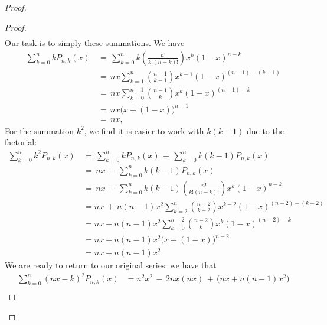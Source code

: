 \documentclass[11pt]{article}
\begin{document}
\begin{adjustwidth}{1cm}{}
\begin{proof}
\begin{adjustwidth}{1cm}{}
\begin{proof}
\begin{align*}
        \end{align*}
        Our task is to simply these summations. We have
        \begin{align*}
          \sum\limits_{k = 0}^{n} k P_{n, k}(x) \, &= \, \sum\limits_{k = 0}^{n} k \left( \frac{n!}{k! (n - k)!} \right) x^{k} (1 - x)^{n - k} \\
                                                &= \, nx \sum\limits_{k = 1}^{n} \binom{n - 1}{k - 1} x^{k - 1} (1 - x)^{(n - 1) - (k - 1)} \\
                                                &= \, nx \sum\limits_{k = 0}^{n - 1} \binom{n - 1}{k} x^{k} (1 - x)^{(n - 1) - k} \\
                                                &= \, nx \big( x + (1 - x) \big)^{n - 1} \\
                                                &= \, nx,
        \end{align*}
        For the summation $k^{2}$, we find it is easier to work with $k(k - 1)$ due to the factorial:
        \begin{align*}
          \sum\limits_{k = 0}^{n} k^{2} P_{n, k}(x) \, &= \, \sum\limits_{k = 0}^{n} k P_{n, k}(x) \, + \, \sum\limits_{k = 0}^{n} k(k - 1) P_{n, k}(x) \\
                                                       &= \, nx \, + \, \sum\limits_{k = 0}^{n} k(k - 1) P_{n, k}(x) \\
                                                       &= \, nx \, + \, \sum\limits_{k = 0}^{n} k(k - 1) \left( \frac{n!}{k!(n - k)!} \right) x^{k}(1 - x)^{n - k} \\
                                                       &= nx \, + \, n(n - 1)x^{2} \sum\limits_{k = 2}^{n} \binom{n - 2}{k - 2} x^{k - 2}(1 - x)^{(n - 2) - (k - 2)} \\
                                                       &= nx + n(n - 1)x^{2} \sum\limits_{k = 0}^{n - 2} \binom{n - 2}{k} x^{k} (1 - x)^{(n - 2) - k} \\
                                                       &= nx + n(n - 1)x^{2} \big( x + (1 - x) \big)^{n - 2} \\
                                                       &= nx + n(n - 1)x^{2}. 
        \end{align*}
        We are ready to return to our original series: we have that
        \begin{align*}
          \sum\limits_{k = 0}^{n} (nx - k)^{2} P_{n, k}(x) &= n^{2}x^{2} \, - \, 2nx (nx) \, + \, \big( nx + n(n - 1)x^{2} \big) \\

\end{align*}
\end{proof}
\end{adjustwidth}
\end{proof}
\end{adjustwidth}
\end{document}
